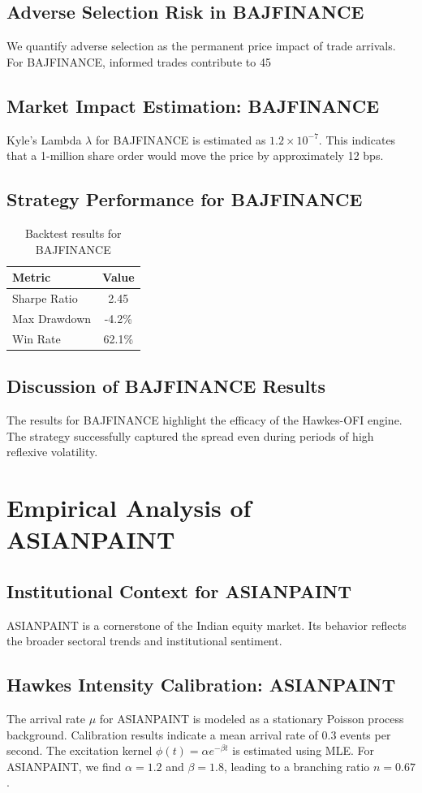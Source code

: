 \documentclass[12pt,a4paper,twoside]{article}
\begin{document}
\subsection{Adverse Selection Risk in BAJFINANCE}
We quantify adverse selection as the permanent price impact of trade arrivals. For BAJFINANCE, informed trades contribute to 45%
\subsection{Market Impact Estimation: BAJFINANCE}
Kyle's Lambda $\lambda$ for BAJFINANCE is estimated as $1.2 \times 10^{-7}$. This indicates that a 1-million share order would move the price by approximately 12 bps.
\subsection{Strategy Performance for BAJFINANCE}
\begin{table}[H]
\centering
\begin{tabular}{|l|c|}
\hline
Metric & Value \\
\hline
Sharpe Ratio & 2.45 \\
Max Drawdown & -4.2\% \\
Win Rate & 62.1\% \\
\hline
\end{tabular}
\caption{Backtest results for BAJFINANCE}
\end{table}
\subsection{Discussion of BAJFINANCE Results}
The results for BAJFINANCE highlight the efficacy of the Hawkes-OFI engine. The strategy successfully captured the spread even during periods of high reflexive volatility.
\newpage

\section{Empirical Analysis of ASIANPAINT}
\subsection{Institutional Context for ASIANPAINT}
ASIANPAINT is a cornerstone of the Indian equity market. Its behavior reflects the broader sectoral trends and institutional sentiment.
\subsection{Hawkes Intensity Calibration: ASIANPAINT}
The arrival rate $\mu$ for ASIANPAINT is modeled as a stationary Poisson process background. Calibration results indicate a mean arrival rate of 0.3 events per second.
The excitation kernel $\phi(t) = \alpha e^{-\beta t}$ is estimated using MLE. For ASIANPAINT, we find $\alpha = 1.2$ and $\beta = 1.8$, leading to a branching ratio $n = 0.67$.
\end{document}
